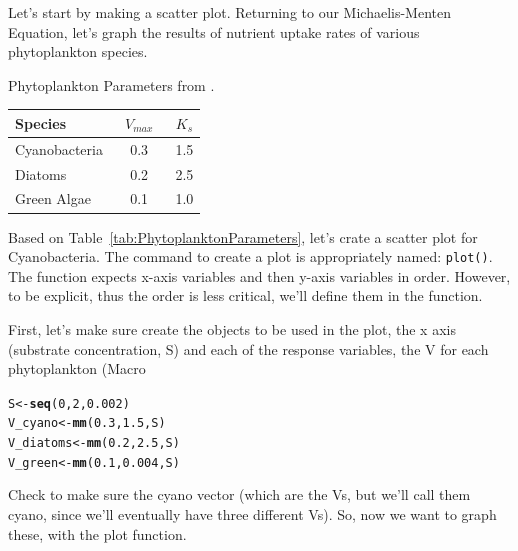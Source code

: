 \documentclass{tufte-handout}\usepackage[]{graphicx}\usepackage[]{color}
\makeatletter
\newcommand{\hlnum}[1]{\textcolor[rgb]{0.686,0.059,0.569}{#1}}%
\newcommand{\hlstd}[1]{\textcolor[rgb]{0.345,0.345,0.345}{#1}}%
\newcommand{\hlkwb}[1]{\textcolor[rgb]{0.69,0.353,0.396}{#1}}%
\newcommand{\hlkwd}[1]{\textcolor[rgb]{0.737,0.353,0.396}{\textbf{#1}}}%
\newenvironment{kframe}{%
 \def\at@end@of@kframe{}%
 \ifinner\ifhmode%
  \def\at@end@of@kframe{\end{minipage}}%
  \begin{minipage}{\columnwidth}%
 \fi\fi%
 \def\FrameCommand##1{\hskip\@totalleftmargin \hskip-\fboxsep
 \colorbox{shadecolor}{##1}\hskip-\fboxsep
     \hskip-\linewidth \hskip-\@totalleftmargin \hskip\columnwidth}%
 \MakeFramed {\advance\hsize-\width
   \@totalleftmargin\z@ \linewidth\hsize
   \@setminipage}}%
 {\par\unskip\endMakeFramed%
 \at@end@of@kframe}
\newenvironment{knitrout}{}{} %
\makeatother
\begin{document}
Let's start by making a scatter plot. Returning to our Michaelis-Menten Equation, let's graph the results of nutrient uptake rates of various phytoplankton species. 

\begin{margintable}
	\caption{Phytoplankton Parameters from \citep{REF}.}
		\begin{tabular}{lcc}
		\toprule
Species &\ $V_{max}$\ & $K_s$ \\
\midrule
Cyanobacteria & 0.3 & 1.5 \\
Diatoms 			& 0.2 & 2.5 \\
Green Algae   & 0.1 & 1.0 \\	
\bottomrule
		\end{tabular}
	\label{tab:PhytoplanktonParameters}
\end{margintable}

Based on Table~\ref{tab:PhytoplanktonParameters}, let's crate a scatter plot for Cyanobacteria. The command to create a plot is appropriately named: \texttt{plot()}. The function expects x-axis variables and then y-axis variables in order. However, to be explicit, thus the order is less critical, we'll define them in the function.

First, let's make sure create the objects to be used in the plot, \ie the x axis (substrate concentration, S) and each of the response variables, the V for each phytoplankton (Macro

\begin{knitrout}
\color{fgcolor}\begin{kframe}
\begin{alltt}
\hlstd{S} \hlkwb{<-} \hlkwd{seq}\hlstd{(}\hlnum{0}\hlstd{,}\hlnum{2}\hlstd{,} \hlnum{0.002}\hlstd{)}
\hlstd{V_cyano}   \hlkwb{<-} \hlkwd{mm}\hlstd{(}\hlnum{0.3}\hlstd{,} \hlnum{1.5}\hlstd{, S)}
\hlstd{V_diatoms} \hlkwb{<-} \hlkwd{mm}\hlstd{(}\hlnum{0.2}\hlstd{,} \hlnum{2.5}\hlstd{, S)}
\hlstd{V_green}   \hlkwb{<-} \hlkwd{mm}\hlstd{(}\hlnum{0.1}\hlstd{,} \hlnum{0.004}\hlstd{, S)}
\end{alltt}
\end{kframe}
\end{knitrout}

Check to make sure the cyano vector (which are the Vs, but we'll call them cyano, since we'll eventually have three different Vs). So, now we want to graph these, with the plot function.
\end{document}
